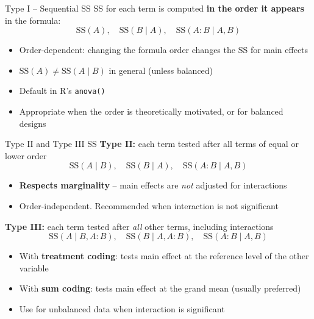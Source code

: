 \documentclass[10pt,ignorenonframetext,aspectratio=169]{beamer}
\begin{document}
\begin{frame}{Type I -- Sequential SS}
    SS for each term is computed \textbf{in the order it appears} in the formula:
    \[
    \text{SS}(A), \quad \text{SS}(B \mid A), \quad \text{SS}(A{:}B \mid A, B)
    \]

    \begin{itemize}
        \item \alert{Order-dependent}: changing the formula order changes the SS for main effects
        \item $\text{SS}(A) \neq \text{SS}(A \mid B)$ in general (unless balanced)
        \item Default in R's \texttt{anova()}
        \item Appropriate when the order is theoretically motivated, or for balanced designs
    \end{itemize}
\end{frame}

\begin{frame}{Type II and Type III SS}
    \textbf{Type II:} each term tested after all terms of equal or lower order
    \[
    \text{SS}(A \mid B), \quad \text{SS}(B \mid A), \quad \text{SS}(A{:}B \mid A, B)
    \]
    \begin{itemize}
        \item \textbf{Respects marginality} -- main effects are \emph{not} adjusted for interactions
        \item Order-independent. Recommended when interaction is not significant
    \end{itemize}

    \bigskip
    \textbf{Type III:} each term tested after \emph{all} other terms, including interactions
    \[
    \text{SS}(A \mid B, A{:}B), \quad \text{SS}(B \mid A, A{:}B), \quad \text{SS}(A{:}B \mid A, B)
    \]
    \begin{itemize}
        \item With \textbf{treatment coding}: tests main effect at the reference level of the other variable
        \item With \textbf{sum coding}: tests main effect at the grand mean (usually preferred)
        \item Use for unbalanced data when interaction is significant
    \end{itemize}
\end{frame}
\end{document}
